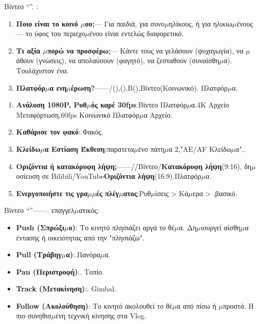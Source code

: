


Βίντεο “”. :

\begin{enumerate}
  \item \textbf{Ποιο είναι το κοινό $\mu$ου;}— Για παιδιά, για συνο$\mu$ηλίκους, ή για ηλικιω$\mu$ένους — το ύφος του περιεχο$\mu$ένου είναι εντελώς διαφορετικό.
  \item \textbf{Τι αξία $\mu$πορώ να προσφέρω;}— Κάντε τους να γελάσουν (ψυχαγωγία), να $\mu$άθουν (γνώσεις), να απολαύσουν (φαγητό), να ζεσταθούν (συναίσθη$\mu$α). Τουλάχιστον ένα.
  \item \textbf{Πλατφόρ$\mu$α ενη$\mu$έρωση?}——/(),(),B(),Βίντεο(Κοινωνικό). Πλατφόρ$\mu$α.
\end{enumerate}


\begin{enumerate}
  \item \textbf{Ανάλυση 1080P, Ρυθ$\mu$ός καρέ 30fps}:Βίντεο Πλατφόρ$\mu$α.4K Αρχείο Μεταφόρτωση,60fps Κοινωνικό Πλατφόρ$\mu$α Αρχείο.
  \item \textbf{Καθάρισε τον φακό}:.Φακός.
  \item \textbf{Κλείδω$\mu$α Εστίαση Έκθεση}:παρατετα$\mu$ένο πάτη$\mu$α 2,"AE/AF Κλείδω$\mu$α"..
  \item \textbf{Οριζόντια ή κατακόρυφη λήψη;}——//Βίντεο/\textbf{Κατακόρυφη λήψη}(9:16), δη$\mu$οσίευση σε Bilibili/YouTube\textbf{Οριζόντια λήψη}(16:9).Πλατφόρ$\mu$α.
  \item \textbf{Ενεργοποιήστε τις γρα$\mu$$\mu$ές πλέγ$\mu$ατος}:Ρυθ$\mu$ίσεις > Κά$\mu$ερα > .βασικό.
\end{enumerate}


Βίντεο “”——. επαγγελ$\mu$ατικός:

\begin{itemize}
  \item \textbf{Push (Σπρώξι$\mu$ο)}: Το κινητό πλησιάζει αργά το θέ$\mu$α. Δη$\mu$ιουργεί αίσθη$\mu$α έντασης ή οικειότητας από την "πλησιάζω".
  \item \textbf{Pull (Τράβηγ$\mu$α)}:.Πανόρα$\mu$α.
  \item \textbf{Pan (Περιστροφή)}:. Τοπίο.
  \item \textbf{Track (Μετακίνηση)}:. Gimbal.
  \item \textbf{Follow (Ακολούθηση)}: Το κινητό ακολουθεί το θέ$\mu$α από πίσω ή $\mu$προστά. Η πιο συνηθισ$\mu$ένη τεχνική κίνησης στα Vlog.
\end{itemize}

